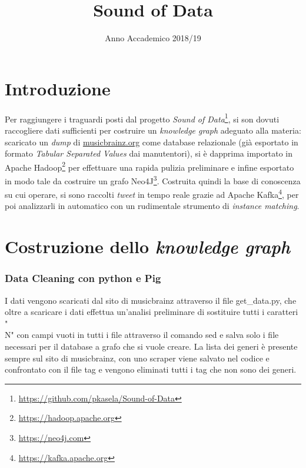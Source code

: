 \documentclass[12pt, a4paper, twocolumn]{article} %
\title{Sound of Data} %
\author{
  \authorstyle{
    Riccardo Cervero \hspace{25pt} 794126 \\  %
    Marco Ferrario \hspace{44pt}  000000 \\   %
    Pranav Kasela \hspace{46.5pt} 000000 \\   %
    Federico Moiraghi \hspace{21pt} 799735    %
  } %
  \newline\newline
  \institution{Università degli Studi di Milano Bicocca}
}
\date{Anno Accademico 2018/19} %
\begin{document}
\maketitle %

\thispagestyle{firstpage} %


\hfill
\newpage

\tableofcontents
\hfill
\newpage

\part{Introduzione}
Per raggiungere i traguardi posti dal progetto \textit{Sound of Data}\footnote{\url{https://github.com/pkasela/Sound-of-Data}}, si son dovuti raccogliere dati sufficienti per costruire un \textit{knowledge graph} adeguato alla materia: scaricato un \textit{dump} di \url{musicbrainz.org} come database relazionale (già esportato in formato \textit{Tabular Separated Values} dai manutentori), si è dapprima importato in Apache Hadoop\footnote{\url{https://hadoop.apache.org}} per effettuare una rapida pulizia preliminare e infine esportato in modo tale da costruire un grafo Neo4J\footnote{\url{https://neo4j.com}}.
Costruita quindi la base di conoscenza su cui operare, si sono raccolti \textit{tweet} in tempo reale grazie ad Apache Kafka\footnote{\url{https://kafka.apache.org}}, per poi analizzarli in automatico con un rudimentale strumento di \textit{instance matching}.

\hfill
\newpage
\part{Costruzione dello \textit{knowledge graph}}

\section{Data Cleaning con python e Pig}
I dati vengono scaricati dal sito di musicbrainz attraverso il file get\_data.py, che oltre a scaricare i dati effettua un'analisi preliminare di sostituire tutti i caratteri "\\N" con campi vuoti in tutti i file attraverso il comando sed e salva solo i file necessari per il database a grafo che si vuole creare. 
La lista dei generi è presente sempre sul sito di musicbrainz, con uno scraper viene salvato nel codice e confrontato con il file tag e vengono eliminati tutti i tag che non sono dei generi.
\end{document}
